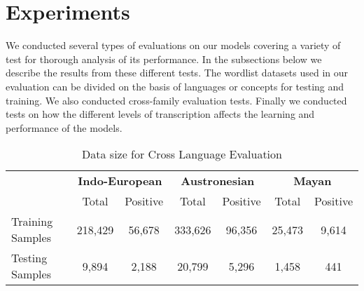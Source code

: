 \documentclass[11pt,letterpaper]{article}
\begin{document}
\section{Experiments}

We conducted several types of evaluations on our models covering a variety of test for thorough analysis of its performance. In the subsections below we describe the results from these different tests.
The wordlist datasets used in our evaluation can be divided on the basis of languages or concepts for testing and training. We also conducted cross-family evaluation tests. Finally we conducted tests on how the different levels of transcription affects the learning and performance of the models.

\begin{table*}[t]
\centering
\begin{tabular}{lcccccc}
\multicolumn{1}{c}{\textbf{}} & \multicolumn{2}{c}{\textbf{Indo-European}} & \multicolumn{2}{c}{\textbf{Austronesian}} & \multicolumn{2}{c}{\textbf{Mayan}} \\
\multicolumn{1}{c}{}          & Total               & Positive             & Total               & Positive            & Total           & Positive         \\
Training Samples              & 218,429             & 56,678               & 333,626             & 96,356              & 25,473          & 9,614            \\
Testing Samples               & 9,894               & 2,188                & 20,799              & 5,296               & 1,458           & 441             
\end{tabular}
\caption{Data size for Cross Language Evaluation}
\label{CL_count}
\end{table*}
\end{document}
